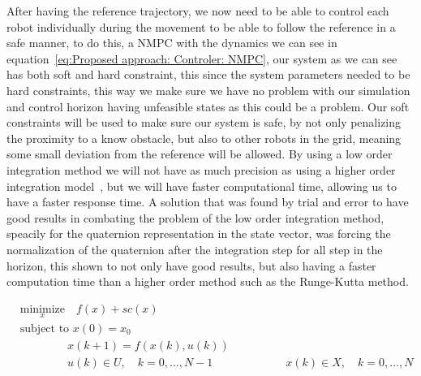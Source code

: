 After having the reference trajectory, we now need to be able to control each robot individually during the movement to be able to follow the reference in a safe manner, to do this, a NMPC with the dynamics we can see in equation~\ref{eq:Proposed approach: Controler: NMPC}, our system as we can see has both soft and hard constraint, this since the system parameters needed to be hard constraints, this way we make sure we have no problem with our simulation and control horizon having unfeasible states as this could be a problem. Our soft constraints will be used to make sure our system is safe, by not only penalizing the proximity to a know obstacle, but also to other robots in the grid, meaning some small deviation from the reference will be allowed.  By using a low order integration method we will not have as much precision as using a higher order integration model~\cite{gros2020linear}, but we will have faster computational time, allowing us to have a faster response time. A solution that was found by trial and error to have good results in combating the problem of the low order integration method, speacily for the quaternion representation in the state vector, was forcing the normalization of the quaternion after the integration step for all step in the horizon, this shown to not only have good results, but also having a faster computation time than a higher order method such as the Runge-Kutta method.

\begin{equation}
    \begin{aligned}
        &\underset{x}{\text{minimize}} \quad f(x) + sc(x)\\
        &\text{subject to } x(0) = x_0 \\
        &\quad \quad \quad \quad \, x(k+1) = f(x(k), u(k)) \\ 
        &\quad \quad \quad \quad \, u(k) \in U, \quad k = 0, \dots, N-1
        &\quad \quad \quad \quad \, x(k) \in X, \quad k = 0, \dots, N
    \end{aligned}
    \label{eq:Proposed approach: Controler: NMPC}
\end{equation}

